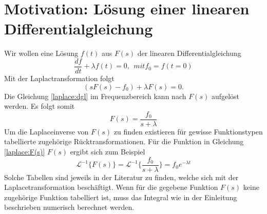 %
%
%



\section{Motivation: Lösung einer linearen Differentialgleichung
\label{laplace:section:problemstellung}}
Wir wollen eine Lösung $f(t)$ aus $F(s)$ der linearen Differentialgleichung 
\[
\frac{df}{dt} + \lambda f(t) = 0, ~~mit f_{0} = f(t=0)
\]
Mit der Laplactransformation folgt
\begin{equation}
(sF(s) - f_{0}) + \lambda F(s) = 0.
\label{laplace:dgl}
\end{equation}
Die Gleichung \eqref{laplace:dgl} im Frequenzbereich kann nach $F(s)$ aufgelöst werden.
Es folgt somit
\begin{equation}
F(s) = \frac{f_{0}}{s + \lambda}
\label{laplace:F(s)}
\end{equation}
Um die Laplaceinverse von $F(s)$ zu finden existieren für gewisse Funktionstypen tabellierte zugehörige Rücktransformationen.
Für die Funktion in Gleichung \eqref{laplace:F(s)} $F(s)$ ergibt sich zum Beispiel
\[
\mathcal{L}^{-1}\{F(s)\}=\mathcal{L}^{-1}\{\frac{f_{0}}{s+\lambda}\} = f_{0}e^{-\lambda t}
\]
Solche Tabellen sind jeweils in der Literatur zu finden, welche sich mit der Laplacetransformation beschäftigt.
Wenn für die gegebene Funktion $F(s)$ keine zugehörige Funktion tabelliert ist, muss das Integral wie in der Einleitung beschrieben numerisch berechnet werden.

